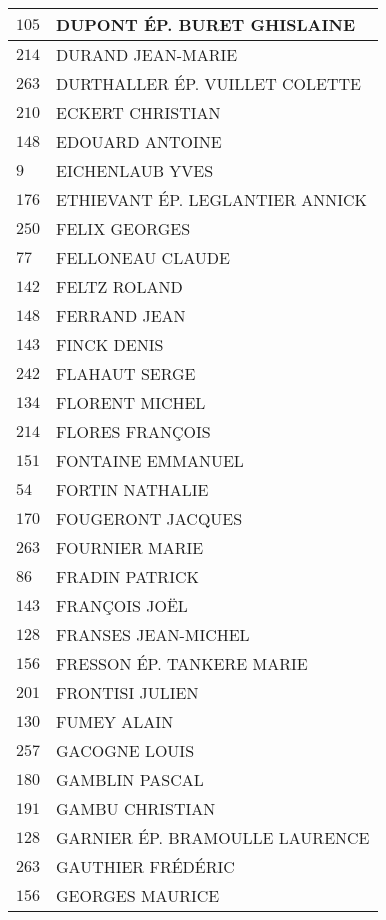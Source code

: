 \begin{xltabular}{\linewidth}{|l|X|}
    \hline
    $105$ & DUPONT ÉP. BURET GHISLAINE \\
    \hline
    $214$ & DURAND JEAN-MARIE \\
    \hline
    $263$ & DURTHALLER ÉP. VUILLET COLETTE \\
    \hline
    $210$ & ECKERT CHRISTIAN \\
    \hline
    $148$ & EDOUARD ANTOINE \\
    \hline
    $9$ & EICHENLAUB YVES \\
    \hline
    $176$ & ETHIEVANT ÉP. LEGLANTIER ANNICK \\
    \hline
    $250$ & FELIX GEORGES \\
    \hline
    $77$ & FELLONEAU CLAUDE \\
    \hline
    $142$ & FELTZ ROLAND \\
    \hline
    $148$ & FERRAND JEAN \\
    \hline
    $143$ & FINCK DENIS \\
    \hline
    $242$ & FLAHAUT SERGE \\
    \hline
    $134$ & FLORENT MICHEL \\
    \hline
    $214$ & FLORES FRANÇOIS \\
    \hline
    $151$ & FONTAINE EMMANUEL \\
    \hline
    $54$ & FORTIN NATHALIE \\
    \hline
    $170$ & FOUGERONT JACQUES \\
    \hline
    $263$ & FOURNIER MARIE \\
    \hline
    $86$ & FRADIN PATRICK \\
    \hline
    $143$ & FRANÇOIS JOËL \\
    \hline
    $128$ & FRANSES JEAN-MICHEL \\
    \hline
    $156$ & FRESSON ÉP. TANKERE MARIE \\
    \hline
    $201$ & FRONTISI JULIEN \\
    \hline
    $130$ & FUMEY ALAIN \\
    \hline
    $257$ & GACOGNE LOUIS \\
    \hline
    $180$ & GAMBLIN PASCAL \\
    \hline
    $191$ & GAMBU CHRISTIAN \\
    \hline
    $128$ & GARNIER ÉP. BRAMOULLE LAURENCE \\
    \hline
    $263$ & GAUTHIER FRÉDÉRIC \\
    \hline
    $156$ & GEORGES MAURICE \\
    \hline

\end{xltabular}
